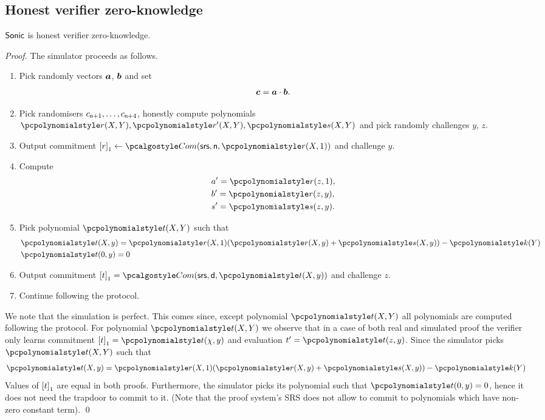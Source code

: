 \documentclass[runningheads,11pt]{llncs}
\let\spvec\vec
\let\vec\accentvec
\let\spvec\vec
\let\vec\spvec
\def\vec#1{\mathchoice{\mbox{\boldmath$\displaystyle#1$}}
  {\mbox{\boldmath$\textstyle#1$}} {\mbox{\boldmath$\scriptstyle#1$}}
  {\mbox{\boldmath$\scriptscriptstyle#1$}}}
\begin{document}
\subsection{Honest verifier zero-knowledge}
\begin{lemma}
\label{lem:sonic_hvzk}
${\textnormal{\textsf{Sonic}}}$ is honest verifier zero-knowledge.
\end{lemma}
\begin{proof}
  The simulator proceeds as follows.
  \begin{enumerate}
  \item Pick randomly vectors $\vec{a}$, $\vec{b}$ and set
    \begin{equation}
      \label{eq:ab_eq_c}
      \vec{c} = \vec{a} \cdot \vec{b}. 
    \end{equation}
  \item Pick randomisers $c_{\mathsf{n} + 1}, \ldots, c_{\mathsf{n} + 4}$,
    honestly compute polynomials $\p{r}(X, Y), \p{r'}(X, Y), \p{s}(X, Y)$ and
    pick randomly challenges $y$, $z$.
  \item Output commitment $\gone{r} \gets \com(\srs, \multconstr, \p{r} (X,
    1))$ and challenge $y$. 
  \item Compute
    \begin{align*}
      & a' = \p{r}(z, 1),\\
      & b' = \p{r}(z, y),\\
      & s' = \p{s}(z, y).
    \end{align*} 
  \item Pick polynomial $\p{t}(X, Y)$ such that
    \begin{align*}
      & \p{t} (X, y) = \p{r} (X, 1) (\p{r}(X, y) + \p{s} (X, y)) - \p{k} (Y)\\
      & \p{t} (0, y) = 0
    \end{align*}
  \item Output commitment $\gone{t} = \com (\srs, \dconst, \p{t} (X, y))$ and
    challenge $z$.
  \item Continue following the protocol.
  \end{enumerate}

  We note that the simulation is perfect. This comes since, except polynomial
  $\p{t} (X, Y)$ all polynomials are computed following the protocol. For
  polynomial $\p{t} (X, Y)$ we observe that in a case of both real and simulated
  proof the verifier only learns commitment $\gone{t} = \p{t} (\chi, y)$ and
  evaluation $t' = \p{t} (z, y)$. Since the simulator picks $\p{t} (X, Y)$ such
  that 
  \begin{align*}
      \p{t} (X, y) = \p{r} (X, 1) (\p{r}(X, y) + \p{s} (X, y)) - \p{k} (Y)
  \end{align*}
  Values of $\left[t\right]_{1}$ are equal in both proofs.
  Furthermore, the simulator picks its polynomial such that $\p{t}(0, y) = 0$,
  hence it does not need the trapdoor to commit to it. (Note that the proof
  system's SRS does not allow to commit to polynomials which have non-zero
  constant term). \qed
\end{proof}
\end{document}
